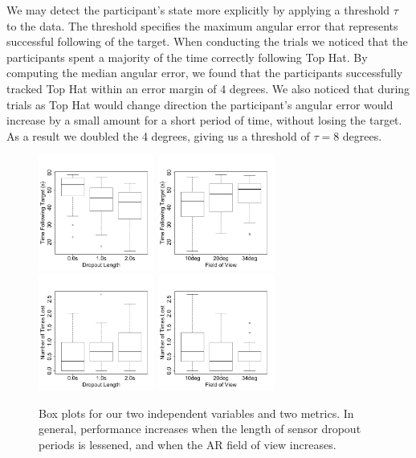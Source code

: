 \documentclass{acmsiggraph}                     %
\begin{document}

We may detect the participant's state more explicitly by applying a threshold $\tau$ to the data.  The threshold specifies the maximum angular error that represents successful following of the target. 
When conducting the trials we noticed that the participants spent a majority of the time correctly following Top Hat.  By computing the median angular error, we found that the participants successfully tracked Top Hat within an error margin of 4 degrees.  We also noticed that during trials as Top Hat would change direction the participant's angular error would increase by a small amount for a short period of time, without losing the target.  As a result we doubled the 4 degrees, giving us a threshold of $\tau = 8$ degrees.  
\begin{figure}[t]
	\centering
	\includegraphics[width=1.5in]{figures/tt_deadlen.pdf}
	\includegraphics[width=1.5in]{figures/tt_fov.pdf}\\
	\includegraphics[width=1.5in]{figures/numtimes_deadlen.pdf}
	\includegraphics[width=1.5in]{figures/numtimes_fov.pdf}
	\caption{\label{fig:tt_deadlen}Box plots for our two independent variables and two metrics.  In general, performance increases when the length of sensor dropout periods is lessened, and when the AR field of view increases.}
\end{figure}
\end{document}
